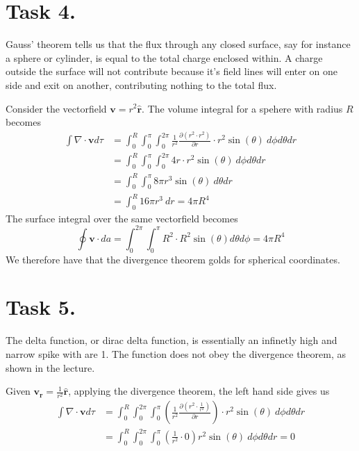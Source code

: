 \documentclass[a4paper,11pt]{article}
\begin{document}
\section*{Task 4.}
\begin{alphalist}
    \item Gauss' theorem tells us that the flux through any closed surface, say for instance a sphere or cylinder, is equal to 
        the total charge enclosed within. A charge outside the surface will not contribute because it's field lines will enter on one side 
        and exit on another, contributing nothing to the total flux.
    \item 
        Consider the vectorfield $\mathbf{v} = r^2 \mathbf{\hat{r}}$. The volume integral for a spehere with radius $R$ becomes
        \begin{align*}
            \int \nabla \cdot \mathbf{v} d\tau &= \int_0^{R} \int_0^\pi \int_0^{2\pi} \frac{1}{r^2} \frac{\partial (r^2 \cdot r^2)}{\partial r} \cdot r^2 \sin(\theta)\: d\phi d\theta dr \\
                                               &= \int_0^{R} \int_0^\pi \int_0^{2\pi} 4r \cdot r^2 \sin(\theta)\: d\phi d\theta dr \\
                                               &= \int_0^{R} \int_0^\pi 8 \pi r^3 \sin(\theta)\: d\theta dr \\
                                               &= \int_0^{R} 16 \pi r^3\: dr = 4 \pi R^4
        \end{align*}
        The surface integral over the same vectorfield becomes
        \[
            \oint \mathbf{v} \cdot da = \int_{0}^{2\pi} \int_{0}^{\pi} R^2 \cdot R^2 \sin(\theta) d\theta d\phi = 4\pi R^4
        \]
        We therefore have that the divergence theorem golds for spherical coordinates.
\end{alphalist}

\section*{Task 5.}
The delta function, or dirac delta function, is essentially an infinetly high and narrow spike with are 1. The function does not obey the divergence theorem,
as shown in the lecture.

Given $\mathbf{v_r} = \frac{1}{r^2}\mathbf{\hat{r}}$, applying the divergence theorem, the left hand side gives us
\begin{align*}
    \int \nabla \cdot \mathbf{v} d\tau &= \int_0^{R} \int_{0}^{2\pi} \int_{0}^{\pi} \left(\frac{1}{r^2} \frac{\partial \left(r^2 \cdot \frac{1}{r^2}\right)}{\partial r}\right) \cdot r^2 \sin(\theta)\: d\phi d\theta dr \\
                                       &= \int_0^{R} \int_{0}^{2\pi} \int_{0}^{\pi} \left(\frac{1}{r^2} \cdot 0\right) r^2 \sin(\theta)\: d\phi d\theta dr = 0 \\
\end{align*}
\end{document}
